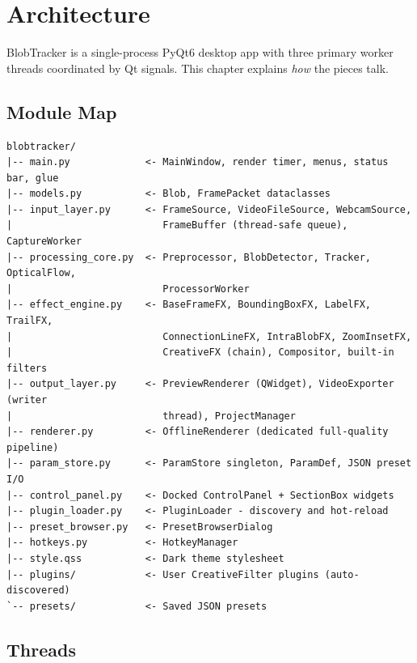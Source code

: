 \documentclass[11pt,a4paper,openany]{report}
\begin{document}
\chapter{Architecture}

BlobTracker is a single-process PyQt6 desktop app with three primary worker
threads coordinated by Qt signals. This chapter explains \emph{how} the
pieces talk.

\section{Module Map}

\begin{lstlisting}[basicstyle=\ttfamily\footnotesize]
blobtracker/
|-- main.py             <- MainWindow, render timer, menus, status bar, glue
|-- models.py           <- Blob, FramePacket dataclasses
|-- input_layer.py      <- FrameSource, VideoFileSource, WebcamSource,
|                          FrameBuffer (thread-safe queue), CaptureWorker
|-- processing_core.py  <- Preprocessor, BlobDetector, Tracker, OpticalFlow,
|                          ProcessorWorker
|-- effect_engine.py    <- BaseFrameFX, BoundingBoxFX, LabelFX, TrailFX,
|                          ConnectionLineFX, IntraBlobFX, ZoomInsetFX,
|                          CreativeFX (chain), Compositor, built-in filters
|-- output_layer.py     <- PreviewRenderer (QWidget), VideoExporter (writer
|                          thread), ProjectManager
|-- renderer.py         <- OfflineRenderer (dedicated full-quality pipeline)
|-- param_store.py      <- ParamStore singleton, ParamDef, JSON preset I/O
|-- control_panel.py    <- Docked ControlPanel + SectionBox widgets
|-- plugin_loader.py    <- PluginLoader - discovery and hot-reload
|-- preset_browser.py   <- PresetBrowserDialog
|-- hotkeys.py          <- HotkeyManager
|-- style.qss           <- Dark theme stylesheet
|-- plugins/            <- User CreativeFilter plugins (auto-discovered)
`-- presets/            <- Saved JSON presets
\end{lstlisting}

\section{Threads}
\end{document}

